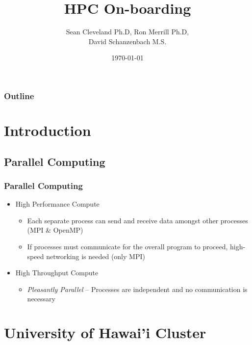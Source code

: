 \documentclass[t,hyperref={pdfpagelabels=false}]{beamer}
\title[On-boarding]{HPC On-boarding} %
\author{Sean Cleveland Ph.D, Ron Merrill Ph.D,\\David Schanzenbach M.S.} %
\institute[University of {\hawaii} -- ITS--CI] %
{
Information Technology Services \\
Department of Cyberinfrastructure \\
University of {\hawaii} \\ %
\medskip
\textbf{\url{https://www.hawaii.edu/its/ci/}}\\
\textbf{\textit{uh-hpc-help@lists.hawaii.edu}} %
}
\date{\today} %
\begin{document}
\begin{frame}
\titlepage %
\end{frame}

\begin{frame}
\frametitle{Outline} %
\tableofcontents[hideallsubsections] %
\end{frame}

\section{Introduction}

\subsection{Parallel Computing}
\begin{frame}
	\frametitle{Parallel Computing}
	\begin{itemize}
		\item High Performance Compute
		\begin{itemize}
			\item Each separate process can send and receive data amongst other processes (MPI \& OpenMP)
			\item If processes must communicate for the overall program to proceed, high-speed networking is needed (only MPI)
		\end{itemize}
		\item High Throughput Compute
		\begin{itemize}
			\item \emph{Pleasantly Parallel} -- Processes are independent and no communication is necessary 
		\end{itemize}
	\end{itemize}
\end{frame}


\section{University of Hawai'i Cluster}
\end{document}

